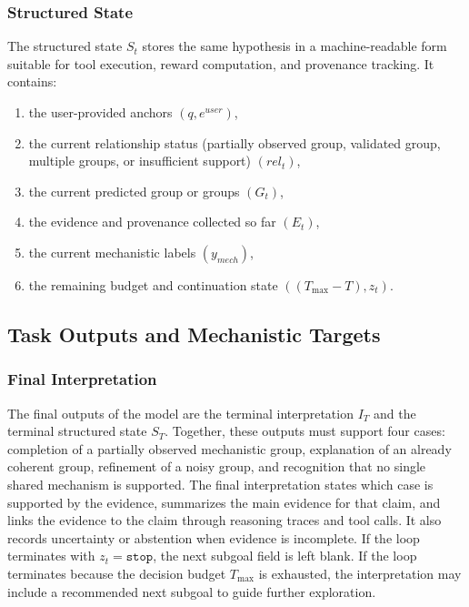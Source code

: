 \documentclass[thesis,letterpaper,12pt]{utthesis}
\begin{document}
\subsubsection{Structured State}\label{sec:structured_state}
The structured state $S_t$ stores the same hypothesis in a machine-readable form suitable for tool execution, reward computation, and provenance tracking. It contains:
\begin{enumerate}
    \item the user-provided anchors $(q, e^{user})$,
    \item the current relationship status (partially observed group, validated group, multiple groups, or insufficient support) $(rel_t)$,
    \item the current predicted group or groups $(G_t)$,
    \item the evidence and provenance collected so far $(E_t)$,
    \item the current mechanistic labels $(y_{mech})$,
    \item the remaining budget and continuation state $((T_{\max} - T), z_t)$.
\end{enumerate}

\subsection{Task Outputs and Mechanistic Targets}\label{sec:task}

\subsubsection{Final Interpretation}
The final outputs of the model are the terminal interpretation $I_T$ and the terminal structured state $S_T$. Together, these outputs must support four cases: completion of a partially observed mechanistic group, explanation of an already coherent group, refinement of a noisy group, and recognition that no single shared mechanism is supported. The final interpretation states which case is supported by the evidence, summarizes the main evidence for that claim, and links the evidence to the claim through reasoning traces and tool calls. It also records uncertainty or abstention when evidence is incomplete. If the loop terminates with $z_t = \texttt{stop}$, the next subgoal field is left blank. If the loop terminates because the decision budget $T_{\max}$ is exhausted, the interpretation may include a recommended next subgoal to guide further exploration.
\end{document}
